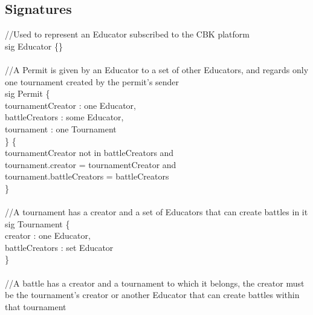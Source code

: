 \documentclass{article}
\begin{document}
{\subsection{Signatures}
\color{gray}
//Used to represent an Educator subscribed to the CBK platform \\
\color{blue}
sig
\color{black}
Educator  \{\} \\
\\
\color{gray}
//A Permit is given by an Educator to a set of other Educators, and regards only one tournament created by the permit's sender\\
\color{blue}
sig
\color{black}
Permit \{\\
\-\hspace{1cm}    tournamentCreator : \color{blue} one \color{black} Educator,\\
\-\hspace{1cm}    battleCreators : \color{blue} some \color{black} Educator,\\
\-\hspace{1cm}    tournament : \color{blue} one \color{black} Tournament\\
\}	\{\\
\-\hspace{1cm}    tournamentCreator \color{blue} not in \color{black} battleCreators \color{blue} and \color{black}\\
\-\hspace{1cm}    tournament.creator \color{blue} = \color{black} tournamentCreator \color{blue} and \color{black}\\
\-\hspace{1cm}    tournament.battleCreators \color{blue} = \color{black} battleCreators\\
\}\\
\\
\color{gray}
//A tournament has a creator and a set of Educators that can create battles in it\\
\color{blue}
sig
\color{black}
Tournament \{ \\
\-\hspace{1cm}    creator : \color{blue} one \color{black} Educator,\\
\-\hspace{1cm}    battleCreators : \color{blue} set \color{black} Educator\\
\}\\
\color{gray}
\\
//A battle has a creator and a tournament to which it belongs, the creator must be the tournament's creator or another Educator that can create battles within that tournament\\
}
\end{document}
